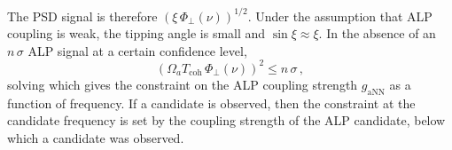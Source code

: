 The PSD signal is therefore $\left(\xi\, \Phi_\perp(\nu)\right)^{1/2}$.
Under the assumption that ALP coupling is weak, the tipping angle is small and $\sin\xi \approx \xi$.
In the absence of an $n\,\sigma$ ALP signal at a certain confidence level,
\begin{equation}
    \left(\Omega_a T_\mathrm{coh} \, \Phi_\perp(\nu)\right)^{2} \leq n\,\sigma
    \,,\label{eq:gaNN_lim_equation}
\end{equation}
solving which gives the constraint on the ALP coupling strength $g_\mathrm{aNN}$ as a function of frequency.
If a candidate is observed, then the constraint at the candidate frequency is set by the coupling strength of the ALP candidate, below which a candidate was observed.








